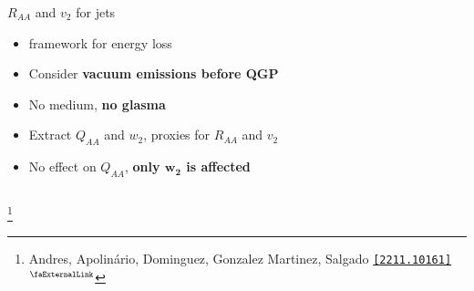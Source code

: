 \documentclass[aspectratio=169,11pt,usenames,dvipsnames]{beamer}
\renewcommand{\thefootnote}{\color{customblue}\faPaperPlaneO}
\newcommand\blfootnote[1]{%
  \begingroup
  \renewcommand\thefootnote{}\footnote{#1}%
  \addtocounter{footnote}{-1}%
  \endgroup
}
\begin{document}
\begin{frame}[t,noframenumbering]
\begin{columns}[onlytextwidth,t]
\begin{center}
            {\Large\color{palteal} $R_{AA}$ and $v_2$ for jets \\[10pt]}
            \footnotesize
                \begin{itemize}
                    \item {\color{lightgray}{\bfseries BDMPS-Z} framework for energy loss}
                    \item {\color{lightgray}Consider {\bfseries vacuum emissions before QGP}}
                    \item {\color{lightgray}No medium, {\bfseries\color{jyured} no glasma}}
                    \item {\color{lightgray}Extract $Q_{AA}$ and $w_2$, proxies for $R_{AA}$ and $v_2$}
                    \item {\color{lightgray}No effect on $Q_{AA}$, {\bfseries only $\boldsymbol{w_2}$ is affected}}
                \end{itemize}
        \end{center}
    \end{columns}
    \blfootnote{\scriptsize Andres, Apolinário, Dominguez, Gonzalez Martinez, Salgado \href{https://arxiv.org/abs/2211.10161}{\color{palgold}\texttt{[2211.10161]}$^\text{\scalebox{0.9}{\faExternalLink}}$}}
\end{frame}



\end{document}
